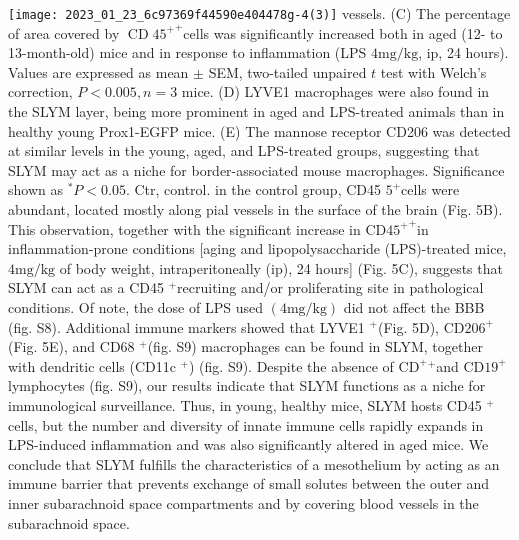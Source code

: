 \texttt{[image: 2023\_01\_23\_6c97369f44590e404478g-4(3)]}
vessels. (C) The percentage of area covered by ${\operatorname{CD} 45^{+}}^{+}$cells was significantly increased both in aged (12- to 13-month-old) mice and in response to inflammation (LPS $4 \mathrm{mg} / \mathrm{kg}$, ip, 24 hours). Values are expressed as mean $\pm$ SEM, two-tailed unpaired $t$ test with Welch's correction, $P<0.005, n=3$ mice. (D) LYVE1 macrophages were also found in the SLYM layer, being more prominent in aged and LPS-treated animals than in healthy young Prox1-EGFP mice. (E) The mannose receptor CD206 was detected at similar levels in the young, aged, and LPS-treated groups, suggesting that SLYM may act as a niche for border-associated mouse macrophages. Significance shown as ${ }^{*} P<0.05$. Ctr, control. in the control group, CD45 $5^{+}$cells were abundant, located mostly along pial vessels in the surface of the brain (Fig. 5B). This observation, together with the significant increase in ${\mathrm{CD} 45^{+}}^{+}$in inflammation-prone conditions [aging and lipopolysaccharide (LPS)-treated mice, $4 \mathrm{mg} / \mathrm{kg}$ of body weight, intraperitoneally (ip), 24 hours] (Fig. 5C), suggests that SLYM can act as a CD45 ${ }^{+}$recruiting and/or proliferating site in pathological conditions. Of note, the dose of LPS used $(4 \mathrm{mg} / \mathrm{kg})$ did not affect the BBB (fig. S8). Additional immune markers showed that LYVE1 ${ }^{+}$(Fig. 5D), $\mathrm{CD} 206^{+}$(Fig. 5E), and CD68 ${ }^{+}$(fig. S9) macrophages can be found in SLYM, together with dendritic cells (CD11c ${ }^{+}$) (fig. S9). Despite the absence of $\mathrm{CD}^{+}{ }^{+}$and $\mathrm{CD} 19^{+}$lymphocytes (fig. S9), our results indicate that SLYM functions as a niche for immunological surveillance. Thus, in young, healthy mice, SLYM hosts CD45 ${ }^{+}$ cells, but the number and diversity of innate immune cells rapidly expands in LPS-induced inflammation and was also significantly altered in aged mice. We conclude that SLYM fulfills the characteristics of a mesothelium by acting as an immune barrier that prevents exchange of small solutes between the outer and inner subarachnoid space compartments and by covering blood vessels in the subarachnoid space.

